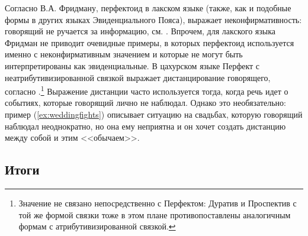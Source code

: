 Согласно В.А. Фридману, перфектоид в лакском языке (также, как и подобные формы в других языках Эвиденциального Пояса), выражает неконфирмативность: говорящий не ручается за информацию, см. \citep{friedman2000}. Впрочем, для лакского языка Фридман не приводит очевидные примеры, в которых перфектоид используется именно с неконфирмативным значением и которые не могут быть интерпретированы как эвиденциальные. В цахурском языке Перфект с неатрибутивизированной связкой выражает дистанцирование говорящего, согласно  \citep{maisaktatevosov2007}.\footnote{Значение не связано непосредственно с Перфектом: Дуратив и Проспектив с той же формой связки тоже в этом плане противопоставлены аналогичным формам с атрибутивизированной связкой.} Выражение дистанции часто используется тогда, когда речь идет о событиях, которые говорящий лично не наблюдал. Однако это необязательно: пример (\ref{ex:weddingfights}) описывает ситуацию на свадьбах, которую говорящий наблюдал неоднократно, но она ему неприятна и он хочет создать дистанцию между собой и этим <<обычаем>>.


\color{purple}

\subsection{Итоги} \label{sec:pfitogi}

